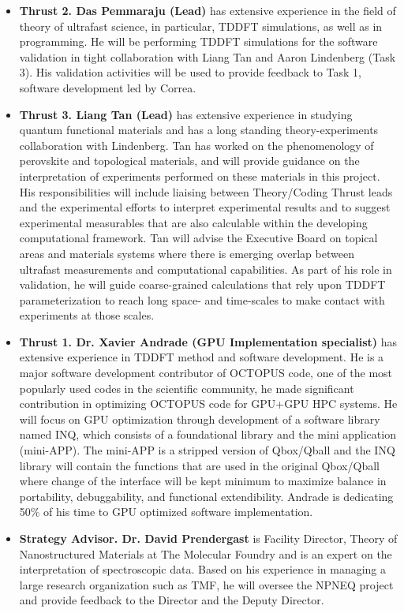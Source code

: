 \begin{itemize}
    \item[]{\bf Thrust 2. Das Pemmaraju (Lead)} has extensive experience in the field of theory of ultrafast science, in particular, TDDFT simulations, as well as in programming. He will be performing TDDFT simulations for the software validation in tight collaboration with Liang Tan and Aaron Lindenberg (Task 3). His validation activities will be used to provide feedback to Task 1, software development led by Correa. 
    
    \item[]{\bf Thrust 3. Liang Tan (Lead)} has extensive experience in studying quantum functional materials and has a long standing theory-experiments collaboration with Lindenberg. Tan has worked on the phenomenology of perovskite and topological materials, and will provide guidance on the interpretation of experiments performed on these materials in this project. His responsibilities will include liaising between Theory/Coding Thrust leads and the experimental efforts to interpret experimental results and to suggest experimental measurables that are also calculable within the developing computational framework. Tan will advise the Executive Board on topical areas and materials systems where there is emerging overlap between ultrafast measurements and computational capabilities. As part of his role in validation, he will guide coarse-grained calculations that rely upon TDDFT parameterization to reach long space- and time-scales to make contact with experiments at those scales.
    
    \item[]{\bf Thrust 1. Dr. Xavier Andrade (GPU Implementation specialist)} has extensive experience in TDDFT method and software development. He is a major software development contributor of OCTOPUS code, one of the most popularly used codes in the scientific community, he made significant contribution in optimizing OCTOPUS code for GPU+GPU HPC systems. He will focus on GPU optimization through development of a software library named INQ, which consists of a foundational library and the mini application (mini-APP). The mini-APP is a stripped version of Qbox/Qball and the INQ library will contain the functions that are used in the original Qbox/Qball where change of the interface will be kept minimum to maximize balance in portability, debuggability, and functional extendibility. Andrade is dedicating 50\% of his time to GPU optimized software implementation.
    
    \item[]{\bf Strategy Advisor. Dr. David Prendergast} is Facility Director, Theory of Nanostructured Materials at The Molecular Foundry and is an expert on the interpretation of spectroscopic data. Based on his experience in managing a large research organization such as TMF, he will oversee the NPNEQ project and provide feedback to the Director and the Deputy Director. 
\end{itemize}
\clearpage